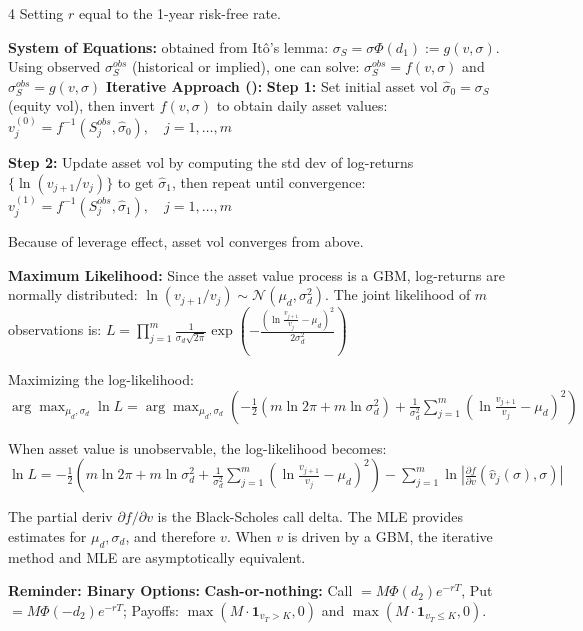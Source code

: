 \documentclass[landscape]{article}
\begin{document}
\begin{multicols}{4}
Setting $r$ equal to the 1-year risk-free rate.

\textcolor{subsubsectioncolor}{\textbf{System of Equations:}} obtained from Itô's lemma: $\sigma_S = \sigma \Phi(d_1) := g(v, \sigma)$.
 Using observed $\sigma_S^{obs}$ (historical or implied), one can solve: $\sigma_S^{obs} = f(v, \sigma)$ and $\sigma_S^{obs} = g(v, \sigma)$
\textcolor{subsubsectioncolor}{\textbf{Iterative Approach ():}} \textbf{Step 1:} Set initial asset vol $\hat{\sigma}_0 = \sigma_S$ (equity vol), then invert $f(v, \sigma)$ to obtain daily asset values: $v_j^{(0)} = f^{-1}(S_j^{obs}, \hat{\sigma}_0), \quad j = 1, \ldots, m$

\textbf{Step 2:} Update asset vol by computing the std dev of log-returns $\{\ln(v_{j+1}/v_j)\}$ to get $\hat{\sigma}_1$, then repeat until convergence: $v_j^{(1)} = f^{-1}(S_j^{obs}, \hat{\sigma}_1), \quad j = 1, \ldots, m$

Because of leverage effect, asset vol converges from above.

\textcolor{subsubsectioncolor}{\textbf{Maximum Likelihood:}} Since the asset value process is a GBM, log-returns are normally distributed: $\ln(v_{j+1}/v_j) \sim \mathcal{N}(\mu_d, \sigma_d^2)$. The joint likelihood of $m$ observations is: $L = \prod_{j=1}^m \frac{1}{\sigma_d\sqrt{2\pi}} \exp\left(-\frac{(\ln\frac{v_{j+1}}{v_j} - \mu_d)^2}{2\sigma_d^2}\right)$

Maximizing the log-likelihood: $\arg\max_{\mu_d,\sigma_d} \ln L = \arg\max_{\mu_d,\sigma_d} \left(-\frac{1}{2}(m\ln 2\pi + m\ln\sigma_d^2) + \frac{1}{\sigma_d^2}\sum_{j=1}^m (\ln\frac{v_{j+1}}{v_j} - \mu_d)^2\right)$

When asset value is unobservable, the log-likelihood becomes: $\ln L = -\frac{1}{2}\left(m\ln 2\pi + m\ln\sigma_d^2 + \frac{1}{\sigma_d^2}\sum_{j=1}^m (\ln\frac{v_{j+1}}{v_j} - \mu_d)^2\right) - \sum_{j=1}^m \ln\left|\frac{\partial f}{\partial v}(\hat{v}_j(\sigma), \sigma)\right|$

The partial deriv $\partial f/\partial v$ is the Black-Scholes call delta. The MLE provides estimates for $\mu_d, \sigma_d$, and therefore $v$. When $v$ is driven by a GBM, the iterative method and MLE are asymptotically equivalent.

\textcolor{subsectioncolor}{\textbf{Reminder: Binary Options:}} \textbf{Cash-or-nothing:} Call $= M\Phi(d_2)e^{-rT}$, Put $= M\Phi(-d_2)e^{-rT}$; Payoffs: $\max(M \cdot \mathbf{1}_{v_T>K}, 0)$ and $\max(M \cdot \mathbf{1}_{v_T \leq K}, 0)$.


\end{multicols}
\end{document}

